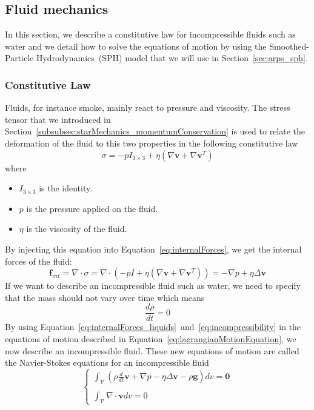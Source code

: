 \subsection{Fluid mechanics}
\label{subsec:fluidMechanics}
In this section, we describe a constitutive law for incompressible fluids such as water and we detail how to solve the equations of motion by using the Smoothed-Particle Hydrodynamics~(SPH) model that we will use in Section~\ref{sec:arps_sph}.
\subsubsection{Constitutive Law}
Fluids, for instance smoke, mainly react to pressure and viscosity.
The stress tensor that we introduced in Section~\ref{subsubsec:starMechanics_momentumConservation} is used to relate the deformation of the fluid to this two properties in the following constitutive law
\begin{equation}
\label{eq:fluidConstitutiveLaw}
\sigma = -pI_{3 \times 3} + \eta \left( \nabla \mathbf{v} + \nabla \mathbf{v}^{T} \right)
\end{equation}
where
\begin{itemize}
    \item $I_{3 \times 3}$ is the identity.
	\item $p$ is the pressure applied on the fluid.
	\item $\eta$ is the viscosity of the fluid.
\end{itemize}
By injecting this equation into Equation~\eqref{eq:internalForces}, we get the internal forces of the fluid:
\begin{equation}
\label{eq:internalForces_liquids}
\mathbf{f}_{int} = \nabla \cdot \sigma = \nabla \cdot \left( -pI + \eta \left( \nabla \mathbf{v} + \nabla \mathbf{v}^{T} \right) \right) = -\nabla p + \eta \Delta \mathbf{v}
\end{equation}
If we want to describe an incompressible fluid such as water, we need to specify that the mass should not vary over time which means
\begin{equation}
\label{eq:incompressibility}
\frac{d\rho}{dt} = 0
\end{equation}
By using Equation~\eqref{eq:internalForces_liquids}~and~\eqref{eq:incompressibility} in the equations of motion described in Equation~\eqref{eq:lagrangianMotionEquation}, we now describe an incompressible fluid. These new equations of motion are called the Navier-Stokes equations for an incompressible fluid
\begin{equation}
\label{eq:navierStokes}
\left\lbrace
\begin{array}{ll}
\displaystyle \int_{\mathcal{V}} \left( \rho \frac{d}{dt} \mathbf{v} + \nabla p - \eta \Delta \mathbf{v} - \rho \mathbf{g} \right)dv = \mathbf{0}\\ \\
\displaystyle \int_{\mathcal{V}} \nabla \cdot \mathbf{v} dv = 0
\end{array}
\right.
\end{equation}
